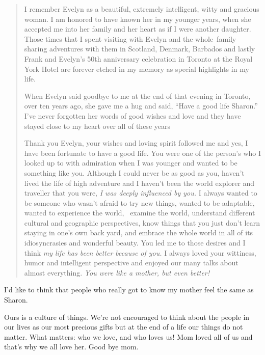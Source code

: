 \begin{quote}
I remember Evelyn as a beautiful, extremely intelligent, witty and
gracious woman. I am honored to have known her in my younger years, when
she accepted me into her family and her heart as if I were another
daughter. Those times that I spent visiting with Evelyn and the
whole~family sharing adventures with them in Scotland, Denmark, Barbados
and lastly Frank and Evelyn's 50th anniversary celebration in Toronto at
the Royal York Hotel are forever etched in my memory as special
highlights in my life.

When Evelyn said goodbye to me at the end of that evening in Toronto,
over ten years ago, she gave me a hug and said, ``Have a good life
Sharon.'' I've never forgotten her words of good wishes and love and
they have stayed close to my heart over all of these years

Thank you Evelyn, your wishes and loving spirit followed me and yes, I
have been fortunate to have a good life. You were one of the person's
who I looked up to with admiration when I was younger and wanted to be
something like you. Although I could never be as good as you, haven't
lived the life of high adventure and I haven't been the world explorer
and traveller that you were, \emph{I was deeply influenced by you.} I
always wanted to be someone who wasn't afraid to try new things, wanted
to be adaptable, wanted to experience the world, ~examine the world,
understand different cultural and geographic perspectives, know things
that you just don't learn staying in one's own back yard, and embrace
the whole world in all of its idiosyncrasies and wonderful beauty. You
led me to those desires and I think \emph{my life has been better
because of you.} I always loved your wittiness, humor and intelligent
perspective and enjoyed our many talks about almost everything.
\emph{You were like a mother, but even better!}
\end{quote}

I'd like to think that people who really got to know my mother feel the
same as Sharon.

Ours is a culture of things. We're not encouraged to think about the
people in our lives as our most precious gifts but at the end of a life
our things do not matter. What matters: who we love, and who loves
us! Mom loved all of us and that's why we all love her. Good bye mom.


